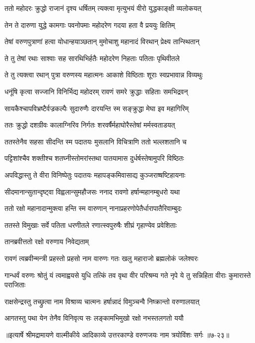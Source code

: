\twolineshloka
{ततो महोदरः क्रुद्धो राजानं दृश्य धर्षितम्}
{त्यक्त्वा मृत्युभयं वीरो युद्धकाङ्क्षी व्यलोकयत्} %

\twolineshloka
{तेन ते दारुणा युद्धे कामगाः पवनोपमाः}
{महोदरेण गदया हता वै प्रययुः क्षितिम्} %

\twolineshloka
{तेषां वरुणपुत्राणां हत्वा योधान्हयाञ्छतान्}
{मुमोचाशु महानादं विरथान् प्रेक्ष्य तान्स्थितान्} %

\twolineshloka
{ते तु तेषां रथाः साश्वाः सह सारथिभिर्हतैः}
{महोदरेण निहताः पतिताः पृथिवीतले} %

\twolineshloka
{ते तु त्यक्त्वा रथान् पुत्रा वरुणस्य महात्मनः}
{आकाशे विष्ठिताः शूराः स्वप्रभावान्न विव्यथुः} %

\twolineshloka
{धनूंषि कृत्वा सज्जानि विनिर्भिद्य महोदरम्}
{रावणं समरे क्रुद्धाः सहिताः समभिद्रवन्} %

\twolineshloka
{सायकैश्चापविभ्रष्टैर्वज्रकल्पैः सुदारुणैः}
{दारयन्ति स्म सङ्क्रुद्धा मेघा इव महागिरिम्} %

\twolineshloka
{ततः क्रुद्धो दशग्रीवः कालाग्निरिव निर्गतः}
{शरवर्षैर्महाघोरैस्तेषां मर्मस्वताडयत्} %

\twolineshloka
{ततस्तेनैव सहसा सीदन्ति स्म पदातयः}
{मुसलानि विचित्राणि ततो भल्लशतानि च} %

\twolineshloka
{पट्टिशांश्चैव शक्तीश्च शतघ्नीस्तोमरांस्तथा}
{पातयामास दुर्धर्षस्तेषामुपरि विष्ठितः} %

\twolineshloka
{अपविद्धास्तु ते वीरा विनिष्पेतुः पदातयः}
{महापङ्कमिवासाद्य कुञ्जराष्षष्टिहायनाः} %

\twolineshloka
{सीदमानान्सुतान्दृष्ट्वा विह्वलान्सुमहौजसः}
{ननाद रावणो हर्षान्महानम्बुधरो यथा} %

\twolineshloka
{ततो रक्षो महानादान्मुक्त्वा हन्ति स्म वारुणान्}
{नानाप्रहरणोपेतैर्धारापातैरिवाम्बुदः} %

\twolineshloka
{ततस्ते विमुखाः सर्वे पतिता धरणीतले}
{रणात्स्वपुरुषैः शीघ्रं गृहाण्येव प्रवेशिताः} %

\onelineshloka
{तानब्रवीत्ततो रक्षो वरुणाय निवेद्यताम्} %

\twolineshloka
{रावणं त्वब्रवीन्मन्त्री प्रहस्तो प्रहसो नाम वारुणः}
{गतः खलु महाराजो ब्रह्मलोकं जलेश्वरः} %

\threelineshloka
{गान्धर्वं वरुणः श्रोतुं यं त्वमाह्वयसे युधि}
{तत्किं तव वृथा वीर परिश्रम्य गते नृपे}
{ये तु सन्निहिता वीराः कुमारास्ते पराजिताः} %

\twolineshloka
{राक्षसेन्द्रस्तु तच्छ्रुत्वा नाम विश्राव्य चात्मनः}
{हर्षान्नादं विमुञ्चन्वै निष्क्रान्तो वरुणालयात्} %

\twolineshloka
{आगतस्तु पथा येन तेनैव विनिवृत्य सः}
{लङ्कामभिमुखो रक्षो नभस्तलगतो ययौ} %


॥इत्यार्षे श्रीमद्रामायणे वाल्मीकीये आदिकाव्ये उत्तरकाण्डे वरुणजयः नाम त्रयोविंशः सर्गः ॥७-२३॥
